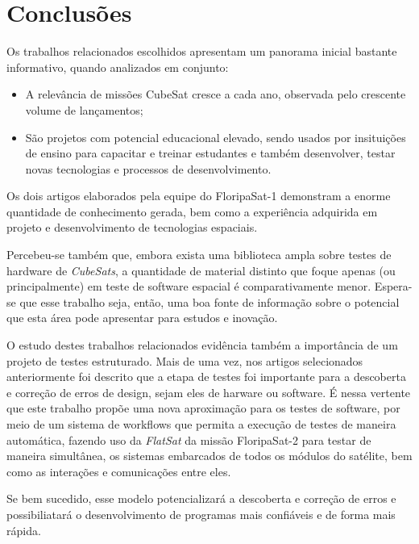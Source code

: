 \chapter{Conclusões}

Os trabalhos relacionados escolhidos apresentam um panorama inicial bastante informativo, quando analizados em conjunto:
\begin{itemize}
    \item A relevância de missões CubeSat cresce a cada ano, observada pelo crescente volume de lançamentos;
    \item São projetos com potencial educacional elevado, sendo usados por insituições de ensino para capacitar e treinar estudantes e também desenvolver, testar novas tecnologias e processos de desenvolvimento.
\end{itemize}
 
 Os dois artigos elaborados pela equipe do FloripaSat-1 demonstram a enorme quantidade de conhecimento gerada, bem como a experiência adquirida em projeto e desenvolvimento de tecnologias espaciais.

Percebeu-se também que, embora exista uma biblioteca ampla sobre testes de hardware de \textit{CubeSats}, a quantidade de material distinto que foque apenas (ou principalmente) em teste de software espacial é comparativamente menor. Espera-se que esse trabalho seja, então, uma boa fonte de informação sobre o potencial que esta área pode apresentar para estudos e inovação.

O estudo destes trabalhos relacionados evidência também a importância de um projeto de testes estruturado. Mais de uma vez, nos artigos selecionados anteriormente foi descrito que a etapa de testes foi importante para a descoberta e correção de erros de design, sejam eles de harware ou software. É nessa vertente que este trabalho propõe uma nova aproximação para os testes de software, por meio de um sistema de workflows que permita a execução de testes de maneira automática, fazendo uso da \textit{FlatSat} da missão FloripaSat-2 para testar de maneira simultânea, os sistemas embarcados de todos os módulos do satélite, bem como as interações e comunicações entre eles.

Se bem sucedido, esse modelo potencializará a descoberta e correção de erros e possibiliatará o desenvolvimento de programas mais confiáveis e de forma mais rápida.


